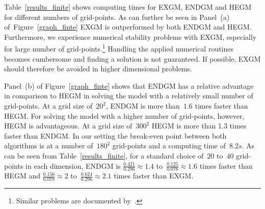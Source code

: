 \documentclass[a4paper,12pt]{article}%
\begin{document}
Table~\ref{results_finite} shows computing times for EXGM, ENDGM and HEGM for different numbers of grid-points. As can further be seen in Panel~(a) of~Figure~\ref{graph_finte} EXGM is outperformed by both ENDGM and HEGM. Furthermore, we experience numerical stability problems with EXGM, especially for large number of grid-points.\footnote{Similar problems are documented by~.}
Handling the applied numerical routines becomes cumbersome and finding a solution is not guaranteed. If possible, EXGM should therefore be avoided in higher dimensional problems.

Panel~(b) of Figure~\ref{graph_finte} shows that ENDGM has a relative advantage in comparison to HEGM in solving the model with a relatively small number of grid-points. At a grid size of~$20^{2}$, ENDGM is more than~$1.6$ times faster than HEGM. For solving the model with a higher number of grid-points, however, HEGM is advantageous. At a grid size of~$300^{2}$ HEGM is more than 1.3 times faster than ENDGM. In our setting the break-even point between both algorithms is at a number of~$180^{2}$ grid-points and a computing time of~$8.2s.$ As can be seen from Table~\ref{results_finite}, for a standard choice of~$20$ to~$40$ grid-points in each dimension, ENDGM is $\frac{0.421}{0.296}\approx1.4$ to~$\frac{0.125}{0.078}\approx1.6$ times faster than HEGM and $\frac{0.156}{0.078}\approx2$ to~$\frac{0.624}{0.296}\approx2.1$ times faster than EXGM.
\end{document}
